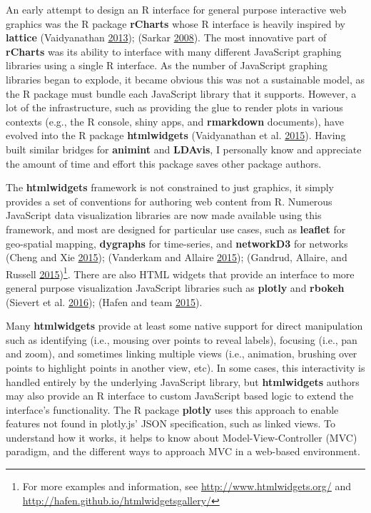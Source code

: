 \documentclass[12pt,]{isuthesis}
\let\rmarkdownfootnote\footnote%
\def\footnote{\protect\rmarkdownfootnote}
\begin{document}
An early attempt to design an R interface for general purpose
interactive web graphics was the R package \textbf{rCharts} whose R
interface is heavily inspired by \textbf{lattice} (Vaidyanathan
\protect\hyperlink{ref-rCharts}{2013}); (Sarkar
\protect\hyperlink{ref-lattice}{2008}). The most innovative part of
\textbf{rCharts} was its ability to interface with many different
JavaScript graphing libraries using a single R interface. As the number
of JavaScript graphing libraries began to explode, it became obvious
this was not a sustainable model, as the R package must bundle each
JavaScript library that it supports. However, a lot of the
infrastructure, such as providing the glue to render plots in various
contexts (e.g., the R console, shiny apps, and \textbf{rmarkdown}
documents), have evolved into the R package \textbf{htmlwidgets}
(Vaidyanathan et al. \protect\hyperlink{ref-htmlwidgets}{2015}). Having
built similar bridges for \textbf{animint} and \textbf{LDAvis}, I
personally know and appreciate the amount of time and effort this
package saves other package authors.

The \textbf{htmlwidgets} framework is not constrained to just graphics,
it simply provides a set of conventions for authoring web content from
R. Numerous JavaScript data visualization libraries are now made
available using this framework, and most are designed for particular use
cases, such as \textbf{leaflet} for geo-spatial mapping,
\textbf{dygraphs} for time-series, and \textbf{networkD3} for networks
(Cheng and Xie \protect\hyperlink{ref-leaflet}{2015}); (Vanderkam and
Allaire \protect\hyperlink{ref-dygraphs}{2015}); (Gandrud, Allaire, and
Russell \protect\hyperlink{ref-networkD3}{2015})\footnote{For more
  examples and information, see \url{http://www.htmlwidgets.org/} and
  \url{http://hafen.github.io/htmlwidgetsgallery/}}. There are also HTML
widgets that provide an interface to more general purpose visualization
JavaScript libraries such as \textbf{plotly} and \textbf{rbokeh}
(Sievert et al. \protect\hyperlink{ref-plotly}{2016}); (Hafen and team
\protect\hyperlink{ref-rbokeh}{2015}).

Many \textbf{htmlwidgets} provide at least some native support for
direct manipulation such as identifying (i.e., mousing over points to
reveal labels), focusing (i.e., pan and zoom), and sometimes linking
multiple views (i.e., animation, brushing over points to highlight
points in another view, etc). In some cases, this interactivity is
handled entirely by the underlying JavaScript library, but
\textbf{htmlwidgets} authors may also provide an R interface to custom
JavaScript based logic to extend the interface's functionality. The R
package \textbf{plotly} uses this approach to enable features not found
in plotly.js' JSON specification, such as linked views. To understand
how it works, it helps to know about Model-View-Controller (MVC)
paradigm, and the different ways to approach MVC in a web-based
environment.
\end{document}

